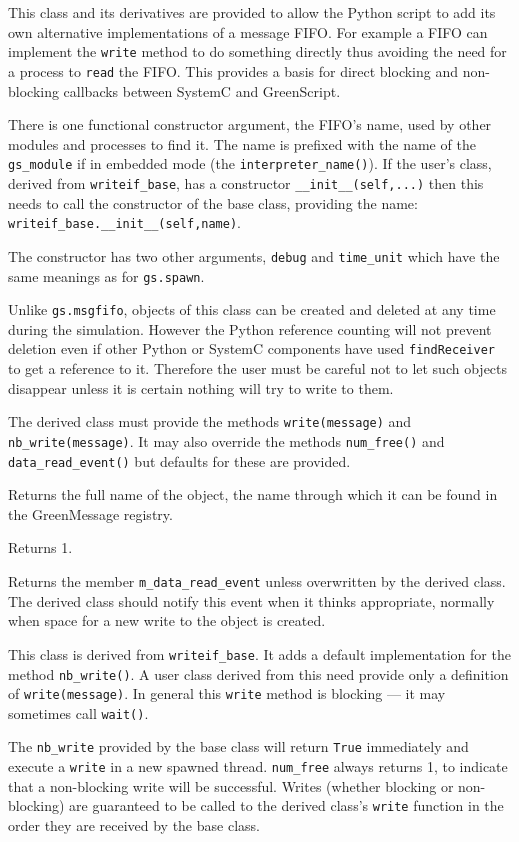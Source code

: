 \documentclass[12pt,oneside]{gsbook}
\begin{document}
 { This class and its derivatives are provided
to allow the Python script
to add its own alternative implementations of a message FIFO.  For example a FIFO
can implement the \texttt{write} method to do something directly thus avoiding the
need for a process to \texttt{read} the FIFO.  This provides a basis for direct
blocking and non-blocking callbacks between SystemC and GreenScript.

There is one functional constructor argument, the FIFO's name, used by other modules and processes
to find it.  The name is prefixed with the name of the \texttt{gs\_module} if
in embedded mode (the \texttt{interpreter\_name()}).  If the user's class,
derived from \texttt{writeif\_base}, has
a constructor \texttt{\_\_init\_\_(self,...)} then this needs to call the constructor
of the base class, providing the name:  \texttt{writeif\_base.\_\_init\_\_(self,name)}.

The constructor has two other arguments, \texttt{debug} and \texttt{time\_unit}
which have the same meanings as for \texttt{gs.spawn}.

Unlike \texttt{gs.msgfifo}, objects of this class can be created and deleted at any
time during the simulation.  However the Python reference counting will not prevent
deletion even if
other Python or SystemC components have used \texttt{findReceiver} to get a reference
to it.  Therefore the user must be careful not to let such objects disappear unless it is
certain nothing will try to write to them.

The derived class must provide the methods \texttt{write(message)} and
\texttt{nb\_write(message)}.  It may also override the methods
\texttt{num\_free()} and \texttt{data\_read\_event()} but defaults for these
are provided.
}

\begin{methods}
 {Returns the full name of the object, the name
through which it can be found in the GreenMessage registry.}

 {Returns 1.}

 {Returns the member \texttt{m\_data\_read\_event} unless
overwritten by the derived class.  The derived class should notify this event
when it thinks appropriate, normally when space for a new write to the
object is created.}
\end{methods}

 {This class is derived from
\texttt{writeif\_base}.  It adds a default implementation for the
method \texttt{nb\_write()}.  A user class derived from this need provide
only a definition of \texttt{write(message)}.  In general this
\texttt{write} method is blocking --- it may sometimes call \texttt{wait()}.

The \texttt{nb\_write} provided by the base class will return \texttt{True}
immediately and execute a \texttt{write} in a new spawned thread.  \texttt{num\_free}
always returns 1, to indicate that a non-blocking
write will be successful.  Writes (whether blocking or non-blocking) are
guaranteed to be called to the derived class's
\texttt{write} function in the order they are received by the base class.}
\end{document}
